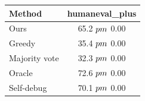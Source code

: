 \begin{tabular}{lc}
\toprule
Method & humaneval_plus \\
\midrule
Ours & 65.2 $\\pm$ 0.00 \\
Greedy & 35.4 $\\pm$ 0.00 \\
Majority vote & 32.3 $\\pm$ 0.00 \\
Oracle & 72.6 $\\pm$ 0.00 \\
Self-debug & 70.1 $\\pm$ 0.00 \\
\bottomrule
\end{tabular}
